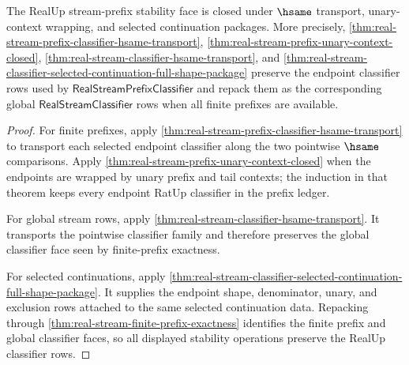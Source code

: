 \begin{theorem}
\label{thm:real-stream-prefix-stability-obligation}
The RealUp stream-prefix stability face is closed under $\hsame$ transport,
unary-context wrapping, and selected continuation packages. More precisely,
\autoref{thm:real-stream-prefix-classifier-hsame-transport},
\autoref{thm:real-stream-prefix-unary-context-closed},
\autoref{thm:real-stream-classifier-hsame-transport}, and
\autoref{thm:real-stream-classifier-selected-continuation-full-shape-package}
preserve the endpoint classifier rows used by
$\mathsf{RealStreamPrefixClassifier}$ and repack them as the corresponding
global $\mathsf{RealStreamClassifier}$ rows when all finite prefixes are
available.
\end{theorem}
\begin{proof}
For finite prefixes, apply
\autoref{thm:real-stream-prefix-classifier-hsame-transport} to transport each
selected endpoint classifier along the two pointwise $\hsame$ comparisons.
Apply \autoref{thm:real-stream-prefix-unary-context-closed} when the endpoints
are wrapped by unary prefix and tail contexts; the induction in that theorem
keeps every endpoint RatUp classifier in the prefix ledger.

For global stream rows, apply
\autoref{thm:real-stream-classifier-hsame-transport}. It transports the
pointwise classifier family and therefore preserves the global classifier face
seen by finite-prefix exactness.

For selected continuations, apply
\autoref{thm:real-stream-classifier-selected-continuation-full-shape-package}.
It supplies the endpoint shape, denominator, unary, and exclusion rows attached
to the same selected continuation data. Repacking through
\autoref{thm:real-stream-finite-prefix-exactness} identifies the finite prefix
and global classifier faces, so all displayed stability operations preserve
the RealUp classifier rows.
\end{proof}

